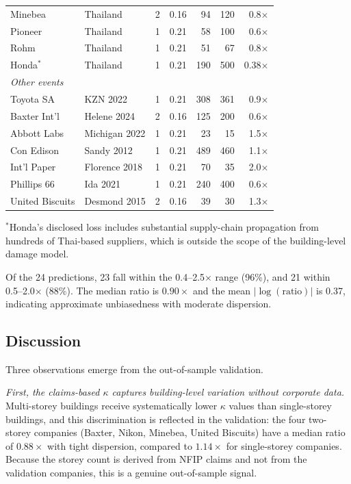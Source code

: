 \begin{table}[!htbp]
{\begin{tabular}{llccrrr}
Minebea              & Thailand & 2 & 0.16 &  94 & 120 & 0.8$\times$ \\
Pioneer              & Thailand & 1 & 0.21 &  58 & 100 & 0.6$\times$ \\
Rohm                 & Thailand & 1 & 0.21 &  51 &  67 & 0.8$\times$ \\
Honda$^{*}$          & Thailand & 1 & 0.21 & 190 & 500 & 0.38$\times$ \\
\midrule
\multicolumn{7}{l}{\textit{Other events}} \\
Toyota SA            & KZN 2022      & 1 & 0.21 & 308 & 361 & 0.9$\times$ \\
Baxter Int'l         & Helene 2024   & 2 & 0.16 & 125 & 200 & 0.6$\times$ \\
Abbott Labs          & Michigan 2022 & 1 & 0.21 &  23 &  15 & 1.5$\times$ \\
Con Edison           & Sandy 2012    & 1 & 0.21 & 489 & 460 & 1.1$\times$ \\
Int'l Paper          & Florence 2018 & 1 & 0.21 &  70 &  35 & 2.0$\times$ \\
Phillips 66          & Ida 2021      & 1 & 0.21 & 240 & 400 & 0.6$\times$ \\
United Biscuits      & Desmond 2015  & 2 & 0.16 &  39 &  30 & 1.3$\times$ \\
\bottomrule
\end{tabular}
}
\begin{flushleft}
\footnotesize
$^{*}$Honda's disclosed loss includes substantial supply-chain propagation from hundreds of Thai-based suppliers, which is outside the scope of the building-level damage model.
\end{flushleft}
\end{table}

Of the 24 predictions, 23 fall within the 0.4--2.5$\times$ range (96\%), and 21 within 0.5--2.0$\times$ (88\%). The median ratio is $0.90\times$ and the mean $|\!\log(\text{ratio})|$ is 0.37, indicating approximate unbiasedness with moderate dispersion.

\subsection{Discussion}

Three observations emerge from the out-of-sample validation.

\textit{First, the claims-based $\kappa$ captures building-level variation without corporate data.} Multi-storey buildings receive systematically lower $\kappa$ values than single-storey buildings, and this discrimination is reflected in the validation: the four two-storey companies (Baxter, Nikon, Minebea, United Biscuits) have a median ratio of $0.88\times$ with tight dispersion, compared to $1.14\times$ for single-storey companies. Because the storey count is derived from NFIP claims and not from the validation companies, this is a genuine out-of-sample signal.

